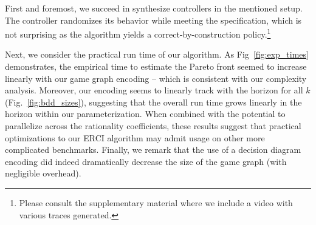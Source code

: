 
First and foremost, we succeed in synthesize controllers in the
mentioned setup.  The controller randomizes its behavior while meeting
the specification, which is not surprising as the algorithm yields a
correct-by-construction policy.\footnote{Please consult the
supplementary material where we include a video with various traces
generated.}

Next, we consider the practical run time of our algorithm.  As
Fig~\ref{fig:exp_times} demonstrates, the empirical time to estimate
the Pareto front seemed to increase linearly with our game graph
encoding -- which is consistent with our complexity analysis.
Moreover, our encoding seems to linearly track with the horizon for
all $k$ (Fig.~\ref{fig:bdd_sizes}), suggesting that the overall run
time grows linearly in the horizon within our parameterization. When
combined with the potential to parallelize across the rationality
coefficients, these results suggest that practical optimizations to
our ERCI algorithm may admit usage on other more complicated
benchmarks. Finally, we remark that the use of a decision diagram
encoding did indeed dramatically decrease the size of the game graph
(with negligible overhead).\footnotemark







